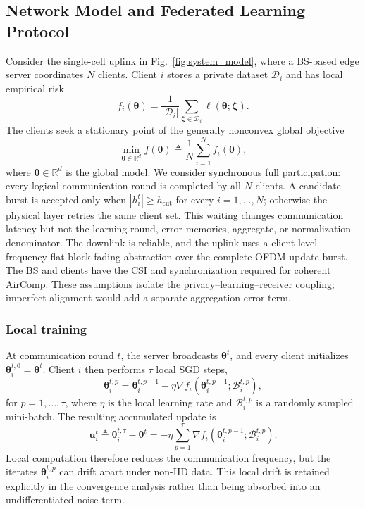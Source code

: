 \documentclass[journal]{IEEEtran}
\begin{document}
\subsection{Network Model and Federated Learning Protocol}

Consider the single-cell uplink in Fig.~\ref{fig:system_model}, where a BS-based edge server coordinates $N$ clients. Client $i$ stores a private dataset $\mathcal{D}_i$ and has local empirical risk
{
\begin{equation}
	f_i(\boldsymbol{\theta})
	=\frac{1}{|\mathcal{D}_i|}
	\sum_{\boldsymbol{\zeta}\in\mathcal{D}_i}
	\ell(\boldsymbol{\theta};\boldsymbol{\zeta}).
\end{equation}
}
The clients seek a stationary point of the generally nonconvex global objective
{
\begin{equation}
	\min_{\boldsymbol{\theta}\in\mathbb{R}^d}
	f(\boldsymbol{\theta})
	\triangleq\frac1N\sum_{i=1}^{N}f_i(\boldsymbol{\theta}),
	\label{eqn:global_objective}
\end{equation}
}
where $\boldsymbol{\theta}\in\mathbb{R}^d$ is the global model. We consider synchronous full participation: every logical communication round is completed by all $N$ clients. A candidate burst is accepted only when $|h_i^t|\ge h_{\mathrm{cut}}$ for every $i=1,\ldots,N$; otherwise the physical layer retries the same client set. This waiting changes communication latency but not the learning round, error memories, aggregate, or normalization denominator. The downlink is reliable, and the uplink uses a client-level frequency-flat block-fading abstraction over the complete OFDM update burst. The BS and clients have the CSI and synchronization required for coherent AirComp. These assumptions isolate the privacy--learning--receiver coupling; imperfect alignment would add a separate aggregation-error term.

\subsubsection{Local training}
At communication round $t$, the server broadcasts $\boldsymbol{\theta}^t$, and every client initializes $\boldsymbol{\theta}_i^{t,0}=\boldsymbol{\theta}^t$. Client $i$ then performs $\tau$ local SGD steps,
{
\begin{equation}
	\boldsymbol{\theta}_i^{t,p}
	=\boldsymbol{\theta}_i^{t,p-1}
	-\eta\nabla f_i(\boldsymbol{\theta}_i^{t,p-1};\mathcal{B}_i^{t,p}),
\end{equation}
}
for $p=1,\ldots,\tau$, where $\eta$ is the local learning rate and $\mathcal{B}_i^{t,p}$ is a randomly sampled mini-batch. The resulting accumulated update is
{
\begin{equation}
	\mathbf{u}_i^t
	\triangleq\boldsymbol{\theta}_i^{t,\tau}-\boldsymbol{\theta}^t
	=-\eta\sum_{p=1}^{\tau}
	\nabla f_i(\boldsymbol{\theta}_i^{t,p-1};\mathcal{B}_i^{t,p}).
	\label{eqn:local_update}
\end{equation}
}
Local computation therefore reduces the communication frequency, but the iterates $\boldsymbol{\theta}_i^{t,p}$ can drift apart under non-IID data. This local drift is retained explicitly in the convergence analysis rather than being absorbed into an undifferentiated noise term.
\end{document}
